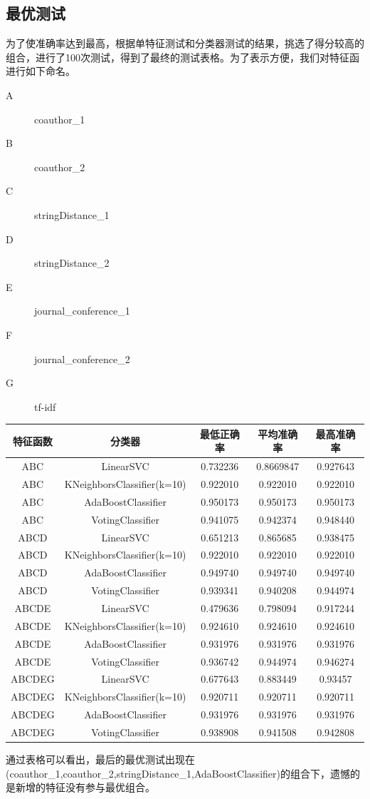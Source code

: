 \documentclass{mcmthesis}
\begin{document}
\subsection{最优测试}
\par 为了使准确率达到最高，根据单特征测试和分类器测试的结果，挑选了得分较高的组合，进行了100次测试，得到了最终的测试表格。为了表示方便，我们对特征函进行如下命名。
\begin{description}
	\item[\qquad \quad A] coauthor\_1
	\item[\qquad \quad B] coauthor\_2
	\item[\qquad \quad C] stringDistance\_1
	\item[\qquad \quad D] stringDistance\_2
	\item[\qquad \quad E] journal\_conference\_1
	\item[\qquad \quad F] journal\_conference\_2
	\item[\qquad \quad G] tf-idf
\end{description}
\begin{center}
	\begin{tabular}{ccccc}
		\hline
		特征函数 & 分类器 &  最低正确率&平均准确率 & 最高准确率 \\
		\hline         
		ABC & LinearSVC & 0.732236 & 0.8669847 & 0.927643\\
		ABC & KNeighborsClassifier(k=10) & 0.922010 &  0.922010  & 0.922010 \\
		ABC & AdaBoostClassifier & 0.950173 & 0.950173 & 0.950173 \\
		ABC & VotingClassifier & 0.941075 &  0.942374  & 0.948440\\
		ABCD & LinearSVC & 0.651213 & 0.865685 & 0.938475\\
		ABCD & KNeighborsClassifier(k=10) &  0.922010 &  0.922010  & 0.922010\\
		ABCD & AdaBoostClassifier & 0.949740 & 0.949740 &0.949740 \\
		ABCD & VotingClassifier & 0.939341 & 0.940208  &0.944974\\
		ABCDE & LinearSVC & 0.479636 & 0.798094 & 0.917244\\
		ABCDE & KNeighborsClassifier(k=10) &  0.924610 &  0.924610  & 0.924610\\
		ABCDE & AdaBoostClassifier & 0.931976 & 0.931976 & 0.931976\\
		ABCDE & VotingClassifier & 0.936742 & 0.944974  &0.946274\\
		ABCDEG & LinearSVC & 0.677643 & 0.883449 & 0.93457\\
		ABCDEG & KNeighborsClassifier(k=10) &  0.920711 &  0.920711  & 0.920711\\
		ABCDEG & AdaBoostClassifier & 0.931976 & 0.931976 & 0.931976\\
		ABCDEG & VotingClassifier & 0.938908 & 0.941508  &0.942808\\
		\hline
	\end{tabular}
\end{center}
\par 通过表格可以看出，最后的最优测试出现在(coauthor\_1,coauthor\_2,stringDistance\_1,AdaBoostClassifier)的组合下，遗憾的是新增的特征没有参与最优组合。
\end{document}
